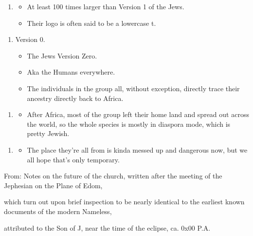 \Sentence
{ \hX{} }
{ \eX{} }
{
\begin{enumerate}
\item[]
\begin{itemize}
\item At least 100 times larger than Version 1 of the Jews.
\item Their logo is often said to be a lowercase t.
\end{itemize}
\end{enumerate}
}

\Sentence
{ \hX{} }
{ \eX{} }
{
\begin{enumerate}
\item[3.] Version 0.
\begin{itemize}
\item The Jews Version Zero.
\item Aka the Humans everywhere.
\item The individuals in the group all, without exception, directly trace their ancestry directly back to Africa.
\end{itemize}
\end{enumerate}
}

\Sentence
{ \hX{} }
{ \eX{} }
{
\begin{enumerate}
\item[]
\begin{itemize}
\item After Africa, most of the group left their home land and spread out across the world, so the whole species is mostly in diaspora mode, which is pretty Jewish.
\end{itemize}
\end{enumerate}
}

\Sentence
{ \hX{} }
{ \eX{} }
{
\begin{enumerate}
\item[]
\begin{itemize}
\item The place they're all from is kinda messed up and dangerous now, but we all hope that's only temporary.
\end{itemize}
\end{enumerate}
}

\Sentence
{ \hX{} }
{ \eX{} }
{
From: Notes on the future of the church, written after the meeting of the Jephesian on the Plane of Edom,
}

\Sentence
{ \hX{} }
{ \eX{} }
{
which turn out upon brief inspection to be nearly identical to the earliest known documents of the modern Nameless,
}

\Sentence
{ \hX{} }
{ \eX{} }
{
attributed to the Son of J, near the time of the eclipse, ca. 0x00 P.A.
}
